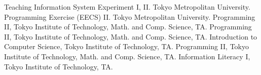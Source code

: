 \begin{rubric}{Teaching}
  \entry*[2024] Information System Experiment I, II. Tokyo Metropolitan University.
  \entry*[2024] Programming Exercise (EECS) II. Tokyo Metropolitan University.
  \entry*[2020] Programming II, Tokyo Institute of Technology, Math. and
  Comp. Science, TA.
  \entry*[2019] Programming II, Tokyo Institute of Technology, Math. and
  Comp. Science, TA.
  \entry*[2019] Introduction to Computer Science, Tokyo Institute of Technology, TA.
  \entry*[2018] Programming II, Tokyo Institute of Technology, Math. and
  Comp. Science, TA.
  \entry*[2018] Information Literacy I, Tokyo Institute of Technology, TA.
\end{rubric}
